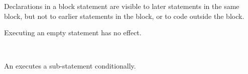 \begin{Note}
	Declarations in a block statement are visible to later statements in the same block, but not to earlier statements in the block, or to code outside the block.
\end{Note}
	


\begin{Description}
	Executing an empty statement has no effect.
\end{Description}
	
\begin{Syntax}
	 \\
		\code{;}
\end{Syntax}

\begin{Checking}
	\CheckStmt{\ContextVarA}{ \code{;} }{\ContextVarA}
\end{Checking}



\begin{Description}
An  executes a sub-statement conditionally.
\end{Description}

\begin{Syntax}
	 \\
		 \code{(}  \code{)}
		\SynOpt \\

		\SynOr {} \\

		  \\
	
\end{Syntax}

\begin{Checking}


	
\end{Checking}

